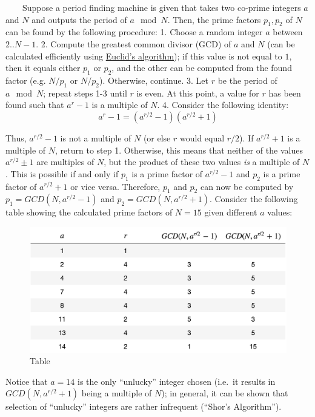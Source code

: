 \documentclass[11pt]{article}
\makeatletter
\def\maxwidth{\ifdim\Gin@nat@width>\linewidth\linewidth
    \else\Gin@nat@width\fi}
\let\Oldincludegraphics\includegraphics
\renewcommand{\includegraphics}[1]{\Oldincludegraphics[width=.8\maxwidth]{#1}}
\makeatother
\begin{document}
~~~~Suppose a period finding machine is given that takes two co-prime
integers \(a\) and \(N\) and outputs the period of \(a\mod N\). Then,
the prime factors \(p_1, p_2\) of \(N\) can be found by the following
procedure: 1. Choose a random integer \(a\) between \(2..N-1\). 2.
Compute the greatest common divisor (GCD) of \(a\) and \(N\) (can be
calculated efficiently using
\href{https://en.wikipedia.org/wiki/Euclidean_algorithm}{Euclid's
algorithm}); if this value is not equal to \(1\), then it equals either
\(p_1\) or \(p_2\), and the other can be computed from the found factor
(e.g. \(N/p_1\) or \(N/p_2\)). Otherwise, continue. 3. Let \(r\) be the
period of \(a\mod N\); repeat steps 1-3 until \(r\) is even. At this
point, a value for \(r\) has been found such that \(a^r-1\) is a
multiple of \(N\). 4. Consider the following identity:
\[a^r-1=(a^{r/2}-1)(a^{r/2}+1)\]

Thus, \(a^{r/2}-1\) is not a multiple of \(N\) (or else \(r\) would
equal \(r/2\)). If \(a^{r/2}+1\) is a multiple of \(N\), return to step
1. Otherwise, this means that neither of the values \(a^{r/2}\pm 1\) are
multiples of \(N\), but the product of these two values \emph{is} a
multiple of \(N\). This is possible if and only if \(p_1\) is a prime
factor of \(a^{r/2}-1\) and \(p_2\) is a prime factor of \(a^{r/2}+1\)
or vice versa. Therefore, \(p_1\) and \(p_2\) can now be computed by
\(p_1=GCD(N, a^{r/2}-1)\) and \(p_2=GCD(N, a^{r/2}+1)\). Consider the
following table showing the calculated prime factors of \(N=15\) given
different \(a\) values:

\begin{figure}
\centering
\includegraphics{table.png}
\caption{Table}
\end{figure}

Notice that \(a=14\) is the only ``unlucky'' integer chosen (i.e.~it
results in \(GCD(N, a^{r/2}+1)\) being a multiple of \(N\)); in general,
it can be shown that selection of ``unlucky'' integers are rather
infrequent (``Shor's Algorithm'').
\end{document}

